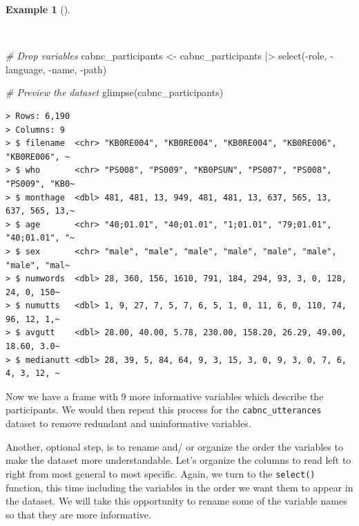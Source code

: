 \documentclass[
  letterpaper,
]{latex/krantz}
\newenvironment{Shaded}{\begin{snugshade}}{\end{snugshade}}
\newcommand{\CommentTok}[1]{\textcolor[rgb]{0.00,0.00,0.00}{\textit{#1}}}
\newcommand{\FunctionTok}[1]{\textcolor[rgb]{0.00,0.00,0.00}{#1}}
\newcommand{\NormalTok}[1]{\textcolor[rgb]{0.00,0.00,0.00}{#1}}
\newcommand{\OtherTok}[1]{\textcolor[rgb]{0.00,0.00,0.00}{#1}}
\newcommand{\SpecialCharTok}[1]{\textcolor[rgb]{0.00,0.00,0.00}{#1}}
\theoremstyle{definition}
\newtheorem{example}{Example}[chapter]
\theoremstyle{remark}
\begin{document}
\begin{example}[]\protect\hypertarget{exm-cd-cabnc-drop-vars}{}\label{exm-cd-cabnc-drop-vars}

~

\begin{Shaded}
\begin{Highlighting}[]
\CommentTok{\# Drop variables}
\NormalTok{cabnc\_participants }\OtherTok{\textless{}{-}}
\NormalTok{  cabnc\_participants }\SpecialCharTok{|\textgreater{}}
  \FunctionTok{select}\NormalTok{(}\SpecialCharTok{{-}}\NormalTok{role, }\SpecialCharTok{{-}}\NormalTok{language, }\SpecialCharTok{{-}}\NormalTok{name, }\SpecialCharTok{{-}}\NormalTok{path)}

\CommentTok{\# Preview the dataset}
\FunctionTok{glimpse}\NormalTok{(cabnc\_participants)}
\end{Highlighting}
\end{Shaded}

\begin{verbatim}
> Rows: 6,190
> Columns: 9
> $ filename  <chr> "KB0RE004", "KB0RE004", "KB0RE004", "KB0RE006", "KB0RE006", ~
> $ who       <chr> "PS008", "PS009", "KB0PSUN", "PS007", "PS008", "PS009", "KB0~
> $ monthage  <dbl> 481, 481, 13, 949, 481, 481, 13, 637, 565, 13, 637, 565, 13,~
> $ age       <chr> "40;01.01", "40;01.01", "1;01.01", "79;01.01", "40;01.01", "~
> $ sex       <chr> "male", "male", "male", "male", "male", "male", "male", "mal~
> $ numwords  <dbl> 28, 360, 156, 1610, 791, 184, 294, 93, 3, 0, 128, 24, 0, 150~
> $ numutts   <dbl> 1, 9, 27, 7, 5, 7, 6, 5, 1, 0, 11, 6, 0, 110, 74, 96, 12, 1,~
> $ avgutt    <dbl> 28.00, 40.00, 5.78, 230.00, 158.20, 26.29, 49.00, 18.60, 3.0~
> $ medianutt <dbl> 28, 39, 5, 84, 64, 9, 3, 15, 3, 0, 9, 3, 0, 7, 6, 4, 3, 12, ~
\end{verbatim}

\end{example}

Now we have a frame with 9 more informative variables which describe the
participants. We would then repeat this process for the
\texttt{cabnc\_utterances} dataset to remove redundant and uninformative
variables.

Another, optional step, is to rename and/ or organize the order the
variables to make the dataset more understandable. Let's organize the
columns to read left to right from most general to most specific. Again,
we turn to the \texttt{select()} function, this time including the
variables in the order we want them to appear in the dataset. We will
take this opportunity to rename some of the variable names so that they
are more informative.
\end{document}
